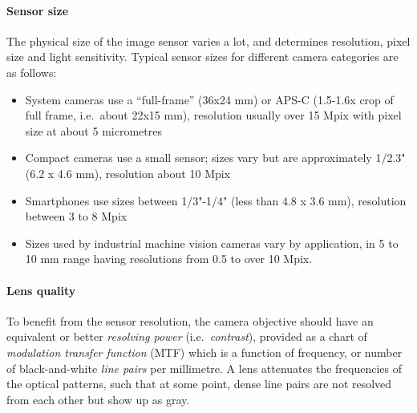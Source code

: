 
\paragraph{Sensor size}
The physical size of the image sensor varies a lot, and determines resolution, pixel size and light sensitivity.
Typical sensor sizes for different camera categories are as follows:

\begin{itemize}
	\item System cameras use a ``full-frame'' (36x24 mm) or APS-C (1.5-1.6x crop of full frame, i.e.~about 22x15 mm), resolution usually over 15 Mpix with pixel size at about 5 micrometres
	\item Compact cameras use a small sensor; sizes vary but are approximately 1/2.3" (6.2 x 4.6 mm), resolution about 10 Mpix
	\item Smartphones use sizes between 1/3"-1/4" (less than 4.8 x 3.6 mm), resolution between 3 to 8 Mpix
	\item Sizes used by industrial machine vision cameras vary by application, in 5 to 10 mm range having resolutions from 0.5 to over 10 Mpix.
\end{itemize}



\paragraph{Lens quality}
To benefit from the sensor resolution, the camera objective should have an equivalent or better \emph{resolving power} (i.e.\ \emph{contrast}), provided as a chart of \emph{modulation transfer function} (MTF) which is a function of frequency, or number of black-and-white \emph{line pairs} per millimetre.
A lens attenuates the frequencies of the optical patterns, such that at some point, dense line pairs are not resolved from each other but show up as gray.
\cite{nakamura2005image} \cite[p. 71]{kingslake1992optics}

